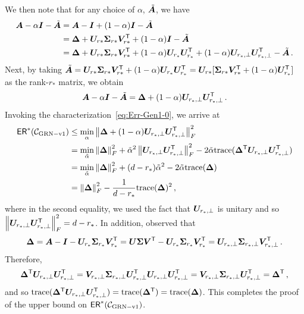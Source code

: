  We then note that for any choice of $\alpha$, $\tilde{{\bm{A}}}$, we have
\begin{align*}
    {\bm{A}}-\alpha \bm{I} - \tilde{{\bm{A}}} &= {\bm{A}}-\bm{I} +(1-\alpha) \bm{I} - \tilde{{\bm{A}}}\\
    &= \bm{\Delta}+{\bm{U}}_{r*}\boldsymbol{\Sigma}_{r*} {\bm{V}}_{r*}^{\sf T}+ (1-\alpha)\bm{I} -\tilde{{\bm{A}}}\\
    &= \bm{\Delta}+{\bm{U}}_{r*}\boldsymbol{\Sigma}_{r*} {\bm{V}}_{r*}^{\sf T}+(1-\alpha) {\bm{U}}_{r_*}{\bm{U}}_{r_*}^{\sf T} +(1-\alpha) {\bm{U}}_{r_*,\perp}{\bm{U}}_{r_*,\perp}^{\sf T}  -\tilde{{\bm{A}}}\,.
\end{align*}
Next, by taking $\tilde{{\bm{A}}} = {\bm{U}}_{r*}\boldsymbol{\Sigma}_{r*} {\bm{V}}_{r*}^{\sf T}+(1-\alpha) {\bm{U}}_{r_*}{\bm{U}}_{r_*}^{\sf T} = {\bm{U}}_{r*} [\boldsymbol{\Sigma}_{r*} {\bm{V}}_{r*}^{\sf T} + (1-\alpha){\bm{U}}_{r_*}^{\sf T} ]$ as the rank-$r_*$ matrix, we obtain 
\[
{\bm{A}}-\alpha \bm{I} - \tilde{{\bm{A}}} = \bm{\Delta} + (1-\alpha) {\bm{U}}_{r_*,\perp}{\bm{U}}_{r_*,\perp}^{\sf T}\,. 
\]
%
Invoking the characterization~\eqref{eq:Err-Gen1-0}, we arrive at
\begin{align*}
   {\sf ER}^*(\mathcal{C}_{\rm GRN-v1{}})
   &\le \min_{\alpha} \left\|\bm{\Delta}+(1-\alpha){\bm{U}}_{r_*,\perp}{\bm{U}}_{r_*,\perp}^{\sf T} \right\|_{F}^2\\
   &= \min_{\tilde{\alpha}} \left\|\bm{\Delta}\right\|_{F}^2+ \tilde{\alpha}^2 \left\|{\bm{U}}_{r_*,\perp}{\bm{U}}_{r_*,\perp}^{\sf T}\right\|_{F}^2 -2\tilde{\alpha} {{\operatorname{trace}}}(\bm{\Delta}^{\sf T} {\bm{U}}_{r_*,\perp}{\bm{U}}_{r_*,\perp}^{\sf T}) \\
   &= \min_{\tilde{\alpha}} \left\|\bm{\Delta}\right\|_{F}^2+ (d-r_*)\tilde{\alpha}^2 -2\tilde{\alpha} {{\operatorname{trace}}}(\bm{\Delta})\\
   &= \left\|\bm{\Delta}\right\|_{F}^2 - \frac{1}{d-r_*} {{\operatorname{trace}}}(\bm{\Delta})^2\,,
\end{align*}
where in the second equality, we used the fact that ${\bm{U}}_{r_*,\perp}$ is unitary and so $\left\|{\bm{U}}_{r_*,\perp}{\bm{U}}_{r_*,\perp}^{\sf T}\right\|_{F}^2= d-r_*$. In addition, observed that
\[\bm{\Delta} = {\bm{A}}-\bm{I}- {\bm{U}}_{r_*} \boldsymbol{\Sigma}_{r_*}{\bm{V}}_{r_*}^{\sf T} = {\bm{U}}\boldsymbol{\Sigma}{\bm{V}}^{\sf T} - {\bm{U}}_{r_*} \boldsymbol{\Sigma}_{r_*}{\bm{V}}_{r_*}^{\sf T} =  {\bm{U}}_{r_*,\perp} \boldsymbol{\Sigma}_{r_*,\perp}{\bm{V}}_{r_*,\perp}^{\sf T}\,.\]
Therefore, 
\[
\bm{\Delta}^{\sf T} {\bm{U}}_{r_*,\perp}{\bm{U}}_{r_*,\perp}^{\sf T} = {\bm{V}}_{r_*,\perp} \boldsymbol{\Sigma}_{r_*,\perp}{\bm{U}}_{r_*,\perp}^{\sf T} {\bm{U}}_{r_*,\perp} {\bm{U}}_{r_*,\perp}^{\sf T}
= {\bm{V}}_{r_*,\perp} \boldsymbol{\Sigma}_{r_*,\perp}{\bm{U}}_{r_*,\perp}^{\sf T} = \bm{\Delta}^{\sf T}\,,
\]
and so ${{\operatorname{trace}}}(\bm{\Delta}^{\sf T} {\bm{U}}_{r_*,\perp}{\bm{U}}_{r_*,\perp}^{\sf T}) = {{\operatorname{trace}}}(\bm{\Delta}^{\sf T})= {{\operatorname{trace}}}(\bm{\Delta})$. This completes the proof of the upper bound on 
${\sf ER}^*(\mathcal{C}_{\rm GRN-v1{}})$.

